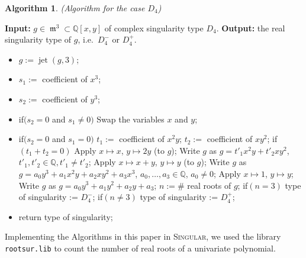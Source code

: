 \documentclass[noend]{amsproc}
\DeclareMathOperator{\m}{\mathfrak{m}}
\DeclareMathOperator{\jt}{jet}
\begin{document}
\newtheorem{D[4]}[kjet]{Algorithm}
\begin{D[4]}(Algorithm for the case $D_4$)\label{D[4]}
\end{D[4]}
\noindent\textnormal{\bf Input:} $g\in \m^3\subset\mathbb Q[x,y]$ of complex
singularity type $D_4$.\newline
\textnormal{\bf Output:} the real singularity type of $g$, i.e.~$D_4^-$
or $D_4^+$.
\begin{itemize}
\item $g := \jt(g,3)$;
\item $s_1:=$ coefficient of ${x^3}$;
\item $s_2 :=$ coefficient of ${y^3}$;
\item if$(s_2=0$ and $s_1\neq0)$\newline
\phantom{}\quad Swap the variables $x$ and $y$;
\item   if$(s_2=0$ and $s_1=0)$\newline
\phantom{}\quad $t_1:=$ coefficient of ${x^2y}$;\newline
\phantom{}\quad $t_2:=$ coefficient of ${xy^2}$;\newline
\phantom{}\quad if$(t_1+t_2=0)$\newline
\phantom{}\quad\quad Apply $x\mapsto x$, $y\mapsto 2y$ (to $g$);\newline
\phantom{}\quad\quad Write $g$ as $g=t'_1x^2y+t'_2xy^2$, $t'_1, t'_2\in\mathbb
Q, t'_1\neq t'_2$;\newline
\phantom{}\quad Apply $x\mapsto x+y$, $y\mapsto y$ (to $g$);\newline
\phantom{}\quad Write $g$ as $g=a_0y^3+a_1x^2y+a_2xy^2+a_3x^3$,
$a_0,\ldots,a_3\in\mathbb
Q$, $a_0\neq 0$;\newline
\phantom{}\quad Apply $x\mapsto 1$, $y\mapsto y$;\newline
\phantom{}\quad Write $g$ as $g=a_0y^3+a_1y^2+a_2y+a_3$;\newline
\phantom{}\quad $n:= \#$ real roots of $g$;\newline
\phantom{}\quad if$(n=3)$\newline
\phantom{}\quad\quad type of singularity := $D_4^-$;\newline
\phantom{}\quad if$(n\neq 3)$\newline
\phantom{}\quad\quad type of singularity := $D_4^+$;
\item return type of singularity;
\end{itemize}

Implementing  the Algorithms in this paper in \textsc{Singular}, we used the
library {\tt rootsur.lib} \cite{roots} to count the number of real roots of a
univariate polynomial.
\end{document}
